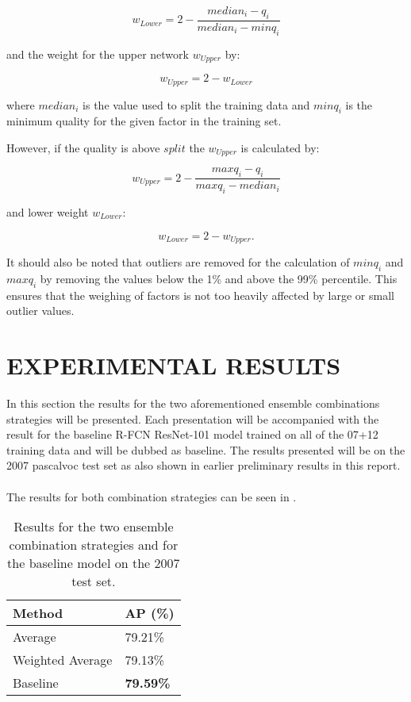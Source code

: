 \documentclass[a4paper,twoside]{article}
\begin{document}
\begin{equation}
	w_{Lower} = 2 - \frac{median_i - q_i}{median_i - minq_i}
\end{equation}

and the weight for the upper network $w_{Upper}$ by:

\begin{equation}
	w_{Upper} = 2 - w_{Lower}
\end{equation}

where $median_i$ is the value used to split the training data and $minq_i$ is the minimum quality for the given factor in the training set.

However, if the quality is above $split$ the $w_{Upper}$ is calculated by:

\begin{equation}
	w_{Upper} = 2 - \frac{maxq_i - q_i}{maxq_i - median_i}
\end{equation}

and lower weight $w_{Lower}$:

\begin{equation}
	w_{Lower} = 2 - w_{Upper}.
\end{equation}

It should also be noted that outliers are removed for the calculation of $minq_i$ and $maxq_i$ by removing the values below the 1\% and above the 99\% percentile. This ensures that the weighing of factors is not too heavily affected by large or small outlier values.

\section{\uppercase{Experimental Results}}
In this section the results for the two aforementioned ensemble combinations strategies will be presented. Each presentation will be accompanied with the result for the baseline R-FCN ResNet-101 model trained on all of the 07+12 training data and will be dubbed as baseline. The results presented will be on the 2007 \gls{pascalvoc} test set as also shown in earlier preliminary results in this report.
\\\\
The results for both combination strategies can be seen in .

\begin{table}[h]
\centering
\caption{Results for the two ensemble combination strategies and for the baseline model on the 2007 test set.}
\label{tab:avgres1}
\begin{tabular}{|l|l|}
\hline
\textbf{Method}           & \textbf{AP (\%)} \\ \hline
Average          & 79.21\% \\ \hline
Weighted Average & 79.13\% \\ \hline
Baseline         & \textbf{79.59\%} \\ \hline
\end{tabular}
\end{table}
\end{document}
